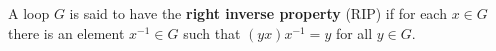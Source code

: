A loop $G$ is said to have the \textbf{right inverse property} (RIP) if for each $x \in G$ there is an element $x^{-1} \in G$ such that $(yx)x^{-1} = y$ for all $y \in G$.
